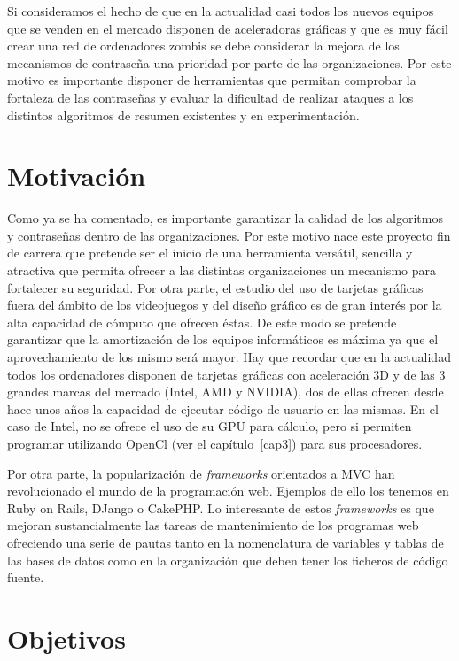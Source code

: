 Si consideramos el hecho de que en la actualidad casi todos los nuevos equipos que se venden en el mercado disponen de aceleradoras gráficas y que es muy fácil crear una red de ordenadores zombis se debe considerar la mejora de los mecanismos de contraseña una prioridad por parte de las organizaciones. Por este motivo es importante disponer de herramientas que permitan comprobar la fortaleza de las contraseñas y evaluar la dificultad de realizar ataques a los distintos algoritmos de resumen existentes y en experimentación.

\section{Motivación}

Como ya se ha comentado, es importante garantizar la calidad de los algoritmos y contraseñas dentro de las organizaciones. Por este motivo nace este proyecto fin de carrera que pretende ser el inicio de una herramienta versátil, sencilla y atractiva que permita ofrecer a las distintas organizaciones un mecanismo para fortalecer su seguridad. Por otra parte, el estudio del uso de tarjetas gráficas fuera del ámbito de los videojuegos y del diseño gráfico es de gran interés por la alta capacidad de cómputo que ofrecen éstas. De este modo se pretende garantizar que la amortización de los equipos informáticos es máxima ya que el aprovechamiento de los mismo será mayor. Hay que recordar que en la actualidad todos los ordenadores disponen de tarjetas gráficas con aceleración 3D y de las 3 grandes marcas del mercado (Intel, AMD y NVIDIA), dos de ellas ofrecen desde hace unos años la capacidad de ejecutar código de usuario en las mismas. En el caso de Intel, no se ofrece el uso de su GPU para cálculo, pero si permiten programar utilizando OpenCl (ver el capítulo~\ref{cap3}) para sus procesadores.

Por otra parte, la popularización de \emph{frameworks} orientados a MVC han revolucionado el mundo de la programación web. Ejemplos de ello los tenemos en Ruby on Rails, DJango o CakePHP. Lo interesante de estos \emph{frameworks} es que mejoran sustancialmente las tareas de mantenimiento de los programas web ofreciendo una serie de pautas tanto en la nomenclatura de variables y tablas de las bases de datos como en la organización que deben tener los ficheros de código fuente.

\section{Objetivos}

